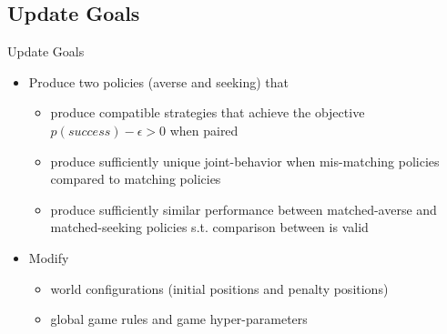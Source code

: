 \documentclass[aspectratio=1610, xcolor=dvipsnames]{packages/beamer}
\begin{document}
\subsection{Update Goals}
\begin{frame}{Update Goals}
\begin{itemize}
        \item Produce two policies (averse and seeking) that
        \begin{itemize}
            \item produce compatible strategies that achieve the objective $p(success) - \epsilon > 0$ when paired
            \item produce sufficiently unique joint-behavior when mis-matching policies compared to matching policies
            \item produce sufficiently similar performance between matched-averse and matched-seeking policies s.t. comparison between is valid
        \end{itemize}
        \item Modify
        \begin{itemize}
             \item world configurations (initial positions and penalty positions)
             \item global game rules and game hyper-parameters
        \end{itemize}
    \end{itemize}
\end{frame}
\end{document}
